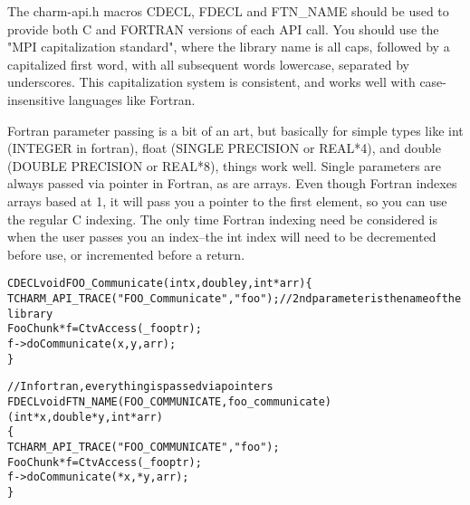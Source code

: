 \documentclass[10pt]{article}
\begin{document}
\begin{itemize}
The charm-api.h macros CDECL, FDECL and
FTN\_NAME should be used to provide both C and FORTRAN versions of each 
API call.  You should use the "MPI capitalization standard", where the library
name is all caps, followed by a capitalized first word, with all subsequent 
words lowercase, separated by underscores.  This capitalization system is 
consistent, and works well with case-insensitive languages like Fortran.

Fortran parameter passing is a bit of an art, but basically for simple 
types like int (INTEGER in fortran), float (SINGLE PRECISION or REAL*4),
and double (DOUBLE PRECISION or REAL*8), things work well.  Single parameters
are always passed via pointer in Fortran, as are arrays.  Even though 
Fortran indexes arrays based at 1, it will pass you a pointer to the 
first element, so you can use the regular C indexing.  The only time Fortran
indexing need be considered is when the user passes you an index--the
int index will need to be decremented before use, or incremented before
a return.

\begin{alltt}
CDECL void FOO\_Communicate(int x, double y, int * arr) \{
   TCHARM\_API\_TRACE("FOO\_Communicate", "foo"); //2nd parameter is the name of the library
   FooChunk *f = CtvAccess(\_fooptr);
   f->doCommunicate(x, y, arr);
\}

//In fortran, everything is passed via pointers
FDECL void FTN\_NAME(FOO_COMMUNICATE, foo_communicate)
     (int *x, double *y, int *arr)
\{
   TCHARM\_API\_TRACE("FOO_COMMUNICATE", "foo");
   FooChunk *f = CtvAccess(\_fooptr);
   f->doCommunicate(*x, *y, arr); 
\}
\end{alltt}

\end{itemize}


\end{document}
